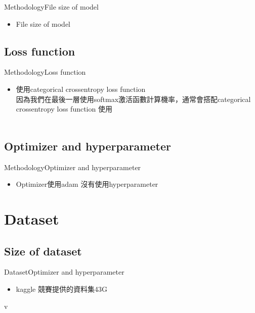 \documentclass{beamer}
\begin{document}
\begin{CJK}{UTF8}{}
\begin{frame}{Methodology}{File size of model}
	\begin{itemize}
	\item{
		File size of model
	}
	\end{itemize}
\end{frame}

\subsection{Loss function}

\begin{frame}{Methodology}{Loss function}
	\begin{itemize}
	\item{
		使用categorical crossentropy loss function\\
		因為我們在最後一層使用softmax激活函數計算機率，通常會搭配categorical crossentropy loss function 使用\\　
	}
	\end{itemize}
\end{frame}

\subsection{Optimizer and hyperparameter}

\begin{frame}{Methodology}{Optimizer and hyperparameter}
	\begin{itemize}
	\item{
		Optimizer使用adam
		沒有使用hyperparameter
	}
	\end{itemize}
\end{frame}

\section{Dataset}

\subsection{Size of dataset}

\begin{frame}{Dataset}{Optimizer and hyperparameter}
	\begin{itemize}
	\item{
		kaggle 競賽提供的資料集43G
	}
	\end{itemize}
\end{frame}v


\end{CJK}
\end{document}
